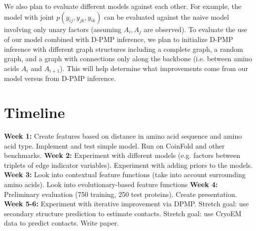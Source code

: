 \documentclass{article}
\begin{document}
We also plan to evaluate different models against each other. For example, the model with joint $p(y_{ij}, y_{jk}, y_{ik})$ can be evaluated against the naive model involving only unary factors (assuming $A_i, A_j$ are observed). To evaluate the use of our model combined with D-PMP inference, we plan to initialize D-PMP inference with different graph structures including a complete graph, a random graph, and a graph with connections only along the backbone (i.e. between amino acids $A_i$ and $A_{i+1}$). This will help determine what improvements come from our model versus from D-PMP inference. 

\section{Timeline}
\textbf{Week 1:} Create features based on distance in amino acid sequence and amino acid type. Implement and test simple model. Run on CoinFold and other benchmarks.
\textbf{Week 2:} Experiment with different models (e.g. factors between triplets of edge indicator variables). Experiment with adding priors to the models.
\textbf{Week 3:} Look into contextual feature functions (take into account surrounding amino acids). Look into evolutionary-based feature functions
\textbf{Week 4:} Preliminary evaluation (750 training, 250 test proteins). Create presentation.
\textbf{Week 5-6:} Experiment with iterative improvement via DPMP. Stretch goal: use secondary structure prediction to estimate contacts. Stretch goal: use CryoEM data to predict contacts. Write paper.
\end{document}
